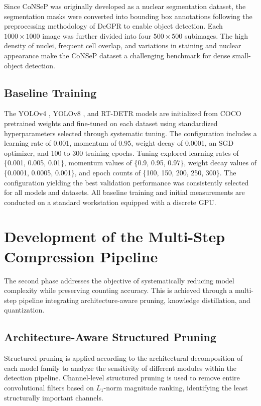 Since CoNSeP was originally developed as a nuclear segmentation dataset, the segmentation masks were converted into bounding box annotations following the preprocessing methodology of DeGPR to enable object detection. Each $1000\times1000$ image was further divided into four $500\times500$ subimages. The high density of nuclei, frequent cell overlap, and variations in staining and nuclear appearance make the CoNSeP dataset a challenging benchmark for dense small-object detection.



\subsection{Baseline Training}
The YOLOv4 \cite{Bochkovskiy2020YOLOv4}, YOLOv8 \cite{yolov8}, and RT-DETR \cite{Zhao2023RTDETR} models are initialized from COCO pretrained weights and fine-tuned on each dataset using standardized hyperparameters selected through systematic tuning. The configuration includes a learning rate of 0.001, momentum of 0.95, weight decay of 0.0001, an SGD optimizer, and 100 to 300 training epochs. Tuning explored learning rates of \{0.001, 0.005, 0.01\}, momentum values of \{0.9, 0.95, 0.97\}, weight decay values of \{0.0001, 0.0005, 0.001\}, and epoch counts of \{100, 150, 200, 250, 300\}. The configuration yielding the best validation performance was consistently selected for all models and datasets. All baseline training and initial measurements are conducted on a standard workstation equipped with a discrete GPU.

\section[Development of the Multi-Step Compression Pipeline]{Development of the Multi-Step\\ Compression Pipeline}
The second phase addresses the objective of systematically reducing model complexity while preserving counting accuracy. This is achieved through a multi-step pipeline integrating architecture-aware pruning, knowledge distillation, and quantization.

\subsection{Architecture-Aware Structured Pruning}
Structured pruning is applied according to the architectural decomposition of each model family to analyze the sensitivity of different modules within the detection pipeline. Channel-level structured pruning is used to remove entire convolutional filters based on $L_1$-norm magnitude ranking, identifying the least structurally important channels. 

